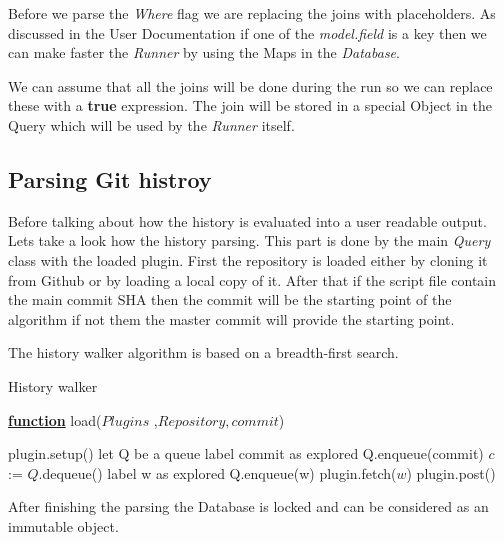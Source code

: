 Before we parse the \textit{Where} flag we are replacing the joins with placeholders.
As discussed in the User Documentation if one of the \textit{model.field} is a key then
we can make faster the \textit{Runner} by using the Maps in the \textit{Database}.

We can assume that all the joins will be done during the run so we can replace these with a
\textbf{true} expression. The join will be stored in a special Object in the Query which will
be used by the \textit{Runner} itself.

\newpage
\subsection{Parsing Git histroy}

Before talking about how the history is evaluated into a user readable output. Lets take a look
how the history parsing. This part is done by the main \textit{Query} class with the loaded
plugin. First the repository is loaded either by cloning it from Github or by loading a local copy of it. After that if the script file contain the main commit SHA then the commit will be the starting point of the algorithm if not them the master commit will provide the starting point.

The history walker algorithm is based on a breadth-first search.

\begin{algorithm}[H]
	\caption{History walker} 
	\label{alg:ibb} 
	\textbf{\underline{function}} load($Plugins$ ,$Repository, commit$)
	\begin{algorithmic}[1] %
		\State plugin.setup()
		\EndFor
		\State let Q be a queue
		\State label commit as explored
		\State Q.enqueue(commit)
		\State $c$ := $Q$.dequeue()
		\State label w as explored  
		\State Q.enqueue(w) 
		\State plugin.fetch($w$)
		\EndFor 
		\EndIf
		\EndFor
		\EndWhile
		\State plugin.post()
		\EndFor
		\end{algorithmic}
\end{algorithm}

After finishing the parsing the Database is locked and can be considered as an immutable object. 

\newpage


